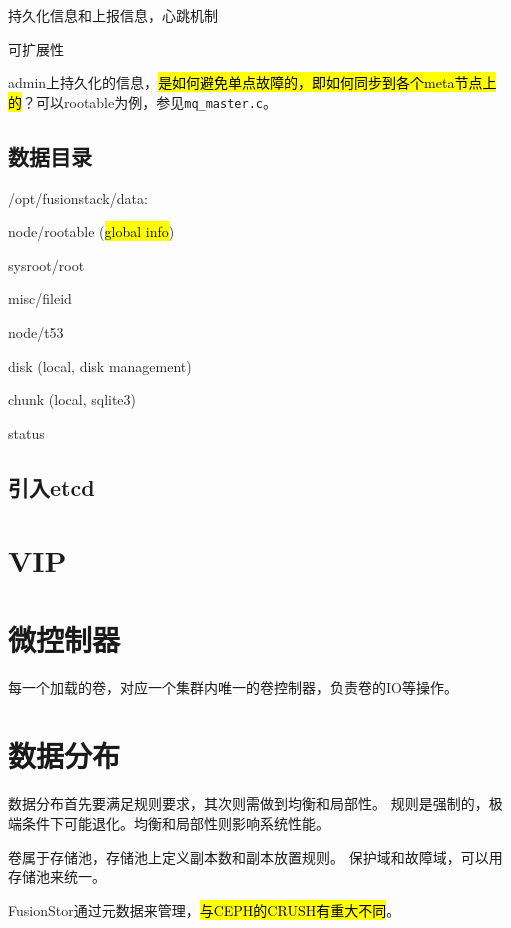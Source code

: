 持久化信息和上报信息，心跳机制

可扩展性

admin上持久化的信息，\hl{是如何避免单点故障的，即如何同步到各个meta节点上的}？可以rootable为例，参见\verb|mq_master.c|。

\subsection{数据目录}

/opt/fusionstack/data:
\begin{itembox}
\item node/rootable (\hl{global info})
    \begin{compactitem}
    \item sysroot/root
    \item misc/fileid
    \item node/t53
    \end{compactitem}
\item disk (local, disk management)
\item chunk (local, sqlite3)
\item status
\end{itembox}

\subsection{引入etcd}

\section{VIP}

\section{微控制器}

每一个加载的卷，对应一个集群内唯一的卷控制器，负责卷的IO等操作。

\section{数据分布}

数据分布首先要满足规则要求，其次则需做到均衡和局部性。
规则是强制的，极端条件下可能退化。均衡和局部性则影响系统性能。

卷属于存储池，存储池上定义副本数和副本放置规则。
保护域和故障域，可以用存储池来统一。

FusionStor通过元数据来管理，\hl{与CEPH的CRUSH有重大不同}。

